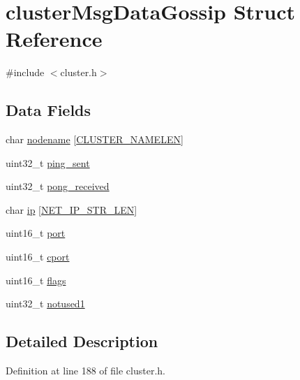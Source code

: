 \hypertarget{structcluster_msg_data_gossip}{}\section{cluster\+Msg\+Data\+Gossip Struct Reference}
\label{structcluster_msg_data_gossip}


{\ttfamily \#include $<$cluster.\+h$>$}

\subsection*{Data Fields}
\begin{DoxyCompactItemize}
\item 
char \hyperlink{structcluster_msg_data_gossip_a50eb514a773ea3e78ec45e62fc0d7b9f}{nodename} \mbox{[}\hyperlink{cluster_8h_ace7a882972eff7149675252938643b6e}{C\+L\+U\+S\+T\+E\+R\+\_\+\+N\+A\+M\+E\+L\+EN}\mbox{]}
\item 
uint32\+\_\+t \hyperlink{structcluster_msg_data_gossip_aa73ed6ac09f49b50a826160bcf8ffbd4}{ping\+\_\+sent}
\item 
uint32\+\_\+t \hyperlink{structcluster_msg_data_gossip_ad2d900a6dca8942733394fe4077d4dd2}{pong\+\_\+received}
\item 
char \hyperlink{structcluster_msg_data_gossip_a9de2afd4e77c16f677244d244270b605}{ip} \mbox{[}\hyperlink{server_8h_ad97c5405ed22a94e9fcc10fba577d6c0}{N\+E\+T\+\_\+\+I\+P\+\_\+\+S\+T\+R\+\_\+\+L\+EN}\mbox{]}
\item 
uint16\+\_\+t \hyperlink{structcluster_msg_data_gossip_a8e0798404bf2cf5dabb84c5ba9a4f236}{port}
\item 
uint16\+\_\+t \hyperlink{structcluster_msg_data_gossip_a6adf88a477cb0a9a34317bf4adbca458}{cport}
\item 
uint16\+\_\+t \hyperlink{structcluster_msg_data_gossip_a1e87af3c18a2fd36c61faf89949bdc3f}{flags}
\item 
uint32\+\_\+t \hyperlink{structcluster_msg_data_gossip_afae9866d130906b6513bb73cdd1d37f2}{notused1}
\end{DoxyCompactItemize}


\subsection{Detailed Description}


Definition at line 188 of file cluster.\+h.



